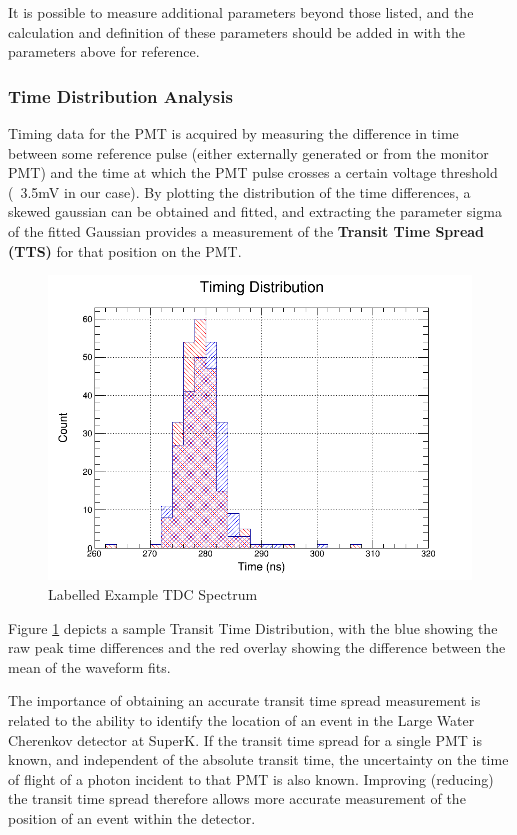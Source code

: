\documentclass[twoside,letterpaper]{refart}
\begin{document}
It is possible to measure additional parameters beyond those listed, and the calculation and definition of these parameters should be added in with the parameters above for reference. 


\subsubsection{Time Distribution Analysis}

Timing data for the PMT is acquired by measuring the difference in time between some reference pulse (either externally generated or from the monitor PMT) and the time at which the PMT pulse crosses a certain voltage threshold (~3.5mV in our case).  By plotting the distribution of the time differences, a skewed gaussian can be obtained and fitted, and extracting the parameter sigma of the fitted Gaussian provides a measurement of the \textbf{Transit Time Spread (TTS)} for that position on the PMT. 

\FloatBarrier

\begin{figure}[!htpb] 
	\centering	
	\includegraphics[scale=0.35]{images/tdcSpectrum.png}
	\caption{Labelled Example TDC Spectrum}
	\label{tdcSpectrum}
\end{figure}

\FloatBarrier

Figure \ref{tdcSpectrum} depicts a sample Transit Time Distribution, with the blue showing the raw peak time differences and the red overlay showing the difference between the mean of the waveform fits.

The importance of obtaining an accurate transit time spread measurement is related to the ability to identify the location of an event in the Large Water Cherenkov detector at SuperK.  If the transit time spread for a single PMT is known, and independent of the absolute transit time, the uncertainty on the time of flight of a photon incident to that PMT is also known.  Improving (reducing) the transit time spread therefore allows more accurate measurement of the position of an event within the detector.
\end{document}
